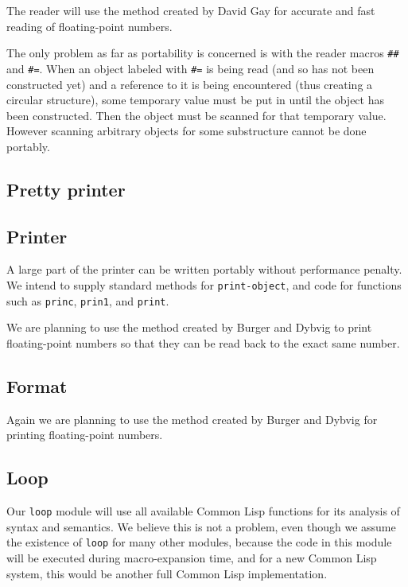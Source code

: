 \documentclass{article}
\begin{document}
The reader will use the method created by David Gay for accurate and
fast reading of floating-point numbers. 

The only problem as far as portability is concerned is with the reader
macros \texttt{\#\#} and \texttt{\#=}.  When an object labeled with
\texttt{\#=} is being read (and so has not been constructed yet) and a
reference to it is being encountered (thus creating a circular
structure), some temporary value must be put in until the object has
been constructed.  Then the object must be scanned for that temporary
value.  However scanning arbitrary objects for some substructure
cannot be done portably.

\subsection{Pretty printer}

\subsection{Printer}

A large part of the printer can be written portably without
performance penalty.  We intend to supply standard methods for
\texttt{print-object}, and code for functions such as \texttt{princ},
\texttt{prin1}, and \texttt{print}. 

We are planning to use the method created by Burger and Dybvig to
print floating-point numbers so that they can be read back to the
exact same number. 

\subsection{Format}

Again we are planning to use the method created by Burger and Dybvig
for printing floating-point numbers. 

\subsection{Loop}

Our \texttt{loop} module will use all available Common Lisp functions
for its analysis of syntax and semantics.  We believe this is not a
problem, even though we assume the existence of \texttt{loop} for many
other modules, because the code in this module will be executed during
macro-expansion time, and for a new Common Lisp system, this would be
another full Common Lisp implementation. 
\end{document}
